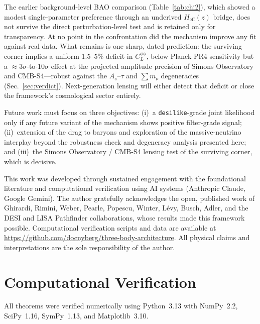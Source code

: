 \documentclass[aps,prd,twocolumn,superscriptaddress,nofootinbib]{revtex4-2}
\theoremstyle{definition}
\theoremstyle{remark}
\begin{document}
The earlier background-level BAO comparison (Table~\ref{tab:chi2}),
which showed a modest single-parameter preference through an underived
$H_{\mathrm{eff}}(z)$ bridge, does not survive the direct
perturbation-level test and is retained only for transparency. At no
point in the confrontation did the mechanism improve any fit against
real data. What remains is one sharp, dated prediction: the surviving
corner implies a uniform $1.5$--$5\%$ deficit in $C_L^{\phi\phi}$,
below Planck PR4 sensitivity but a ${\approx}3\sigma$-to-$10\sigma$
effect at the projected amplitude precision of Simons Observatory and
CMB-S4---robust against the $A_s$--$\tau$ and $\sum m_\nu$
degeneracies (Sec.~\ref{sec:verdict}). Next-generation lensing will
either detect that deficit or close the framework's cosmological
sector entirely.

Future work must focus on three objectives: (i)~a
\texttt{desilike}-grade joint likelihood only if any future variant of
the mechanism shows positive filter-grade signal; (ii)~extension of the
drag to baryons and exploration of the massive-neutrino interplay
beyond the robustness check and degeneracy analysis presented here;
and (iii)~the Simons
Observatory / CMB-S4 lensing test of the surviving corner, which is
decisive.

\begin{acknowledgments}
This work was developed through sustained engagement with the foundational
literature and computational verification using AI systems (Anthropic
Claude, Google Gemini). The author gratefully acknowledges the open,
published work of Ghirardi, Rimini, Weber, Pearle, Popescu, Winter,
L\'evy, Busch, Adler, and the DESI and LISA Pathfinder collaborations,
whose results made this framework possible. Computational verification
scripts and data are available at
\url{https://github.com/docnyberg/three-body-architecture}.
All physical claims and interpretations are the sole responsibility of the
author.
\end{acknowledgments}


\appendix

\section{Computational Verification}
\label{app:computation}

All theorems were verified numerically using Python~3.13 with
NumPy~2.2, SciPy~1.16, SymPy~1.13, and Matplotlib~3.10.
\end{document}
